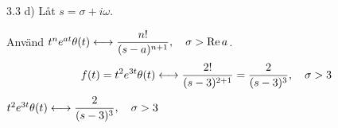 \begin{task}{3.3 d)}
	Låt $s=\sigma+i\omega$.
	
	Använd $t^ne^{at}\theta(t)\longleftrightarrow \dfrac{n!}{(s-a)^{n+1}}, \quad \sigma > \operatorname{Re} a$.
	\begin{align*}
	f(t)=
	t^2e^{3t}\theta(t)\longleftrightarrow
	\frac{2!}{(s-3)^{2+1}}=
	\frac{2}{(s-3)^3}, \quad \sigma > 3
	\end{align*}
	\ans $t^2e^{3t}\theta(t)\longleftrightarrow\dfrac{2}{(s-3)^3}, \quad \sigma > 3$
\end{task}
